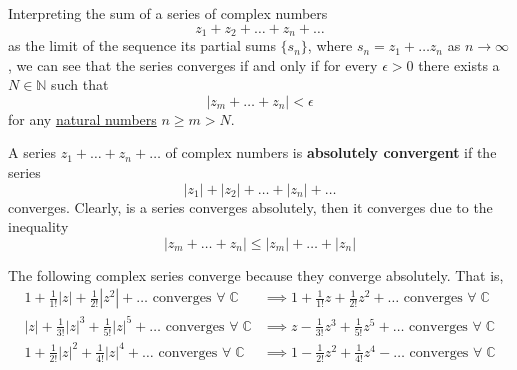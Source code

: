   \begin{lemma}
    \label{thm:convergence-of-cauchy-series-over-c}
    Interpreting the sum of a series of complex numbers
    \begin{equation}
      z_1 + z_2 + \ldots + z_n + \ldots
    \end{equation}
    as the limit of the sequence its partial sums $\{s_n\}$, where $s_n = z_1 + \ldots z_n$ as $n \rightarrow \infty$, we can see that the series converges if and only if for every $\epsilon > 0$ there exists a $N \in \mathbb{N}$ such that 
    \begin{equation}
      |z_m + \ldots + z_n| < \epsilon
    \end{equation}
    for any \hyperref[st-def:naturals]{natural numbers} $n \geq m > N$. 
  \end{lemma}

  \begin{definition}
    \label{def:absolute-convergence-of-c}
    A series $z_1 + \ldots + z_n + \ldots$ of complex numbers is \textbf{absolutely convergent} if the series
    \begin{equation}
      |z_1| + |z_2| + \ldots + |z_n| + \ldots
    \end{equation}
    converges. Clearly, is a series converges absolutely, then it converges due to the inequality
    \begin{equation}
      |z_m + \ldots + z_n| \leq |z_m| + \ldots + |z_n|
    \end{equation}
  \end{definition}

  \begin{example}
    \label{ex:absolutely-convergent-complex-series}
    The following complex series converge because they converge absolutely. That is, 
    \begin{align*}
        1 + \frac{1}{1!}|z| + \frac{1}{2!}|z^2| + \ldots \text{ converges } \forall \; \mathbb{C} & \implies 1 + \frac{1}{1!}z + \frac{1}{2!}z^2 + \ldots \text{ converges } \forall \; \mathbb{C} \\
        |z| + \frac{1}{3!}|z|^3 + \frac{1}{5!}|z|^5 + \ldots \text{ converges } \forall \; \mathbb{C}  & \implies z - \frac{1}{3!} z^3 + \frac{1}{5!}z^5 + \ldots \text{ converges } \forall \; \mathbb{C} \\
        1 + \frac{1}{2!}|z|^2 + \frac{1}{4!} |z|^4 + \ldots \text{ converges }  \forall \; \mathbb{C} & \implies 1 - \frac{1}{2!}z^2 + \frac{1}{4!} z^4 - \ldots \text{ converges }  \forall \; \mathbb{C} 
    \end{align*}
  \end{example}

